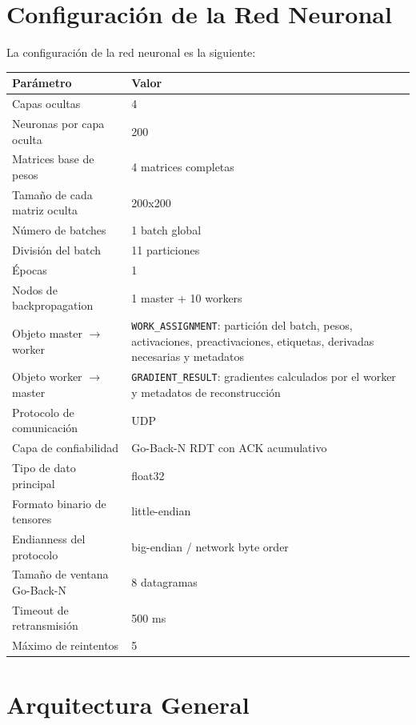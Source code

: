 \documentclass[12pt]{article}
\begin{document}
\section{Configuración de la Red Neuronal}

La configuración de la red neuronal es la siguiente:

\begin{table}[h]
\centering
\begin{tabular}{|p{4.5cm}|p{9cm}|}
\hline
Parámetro & Valor \\
\hline
Capas ocultas & 4 \\
\hline
Neuronas por capa oculta & 200 \\
\hline
Matrices base de pesos & 4 matrices completas \\
\hline
Tamaño de cada matriz oculta & 200x200 \\
\hline
Número de batches & 1 batch global \\
\hline
División del batch & 11 particiones \\
\hline
Épocas & 1 \\
\hline
Nodos de backpropagation & 1 master + 10 workers \\
\hline
Objeto master $\rightarrow$ worker & \texttt{WORK\_ASSIGNMENT}: partición del batch, pesos, activaciones, preactivaciones, etiquetas, derivadas necesarias y metadatos \\
\hline
Objeto worker $\rightarrow$ master & \texttt{GRADIENT\_RESULT}: gradientes calculados por el worker y metadatos de reconstrucción \\
\hline
Protocolo de comunicación & UDP \\
\hline
Capa de confiabilidad & Go-Back-N RDT con ACK acumulativo \\
\hline
Tipo de dato principal & float32 \\
\hline
Formato binario de tensores & little-endian \\
\hline
Endianness del protocolo & big-endian / network byte order \\
\hline
Tamaño de ventana Go-Back-N & 8 datagramas \\
\hline
Timeout de retransmisión & 500 ms \\
\hline
Máximo de reintentos & 5 \\
\hline
\end{tabular}
\end{table}



\section{Arquitectura General}
\end{document}
